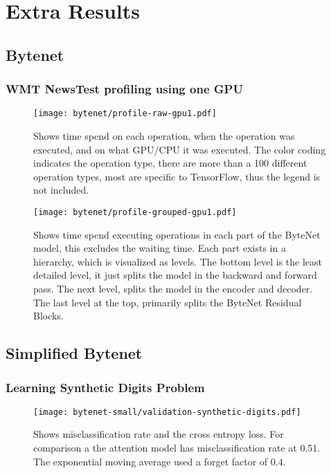 \chapter{Extra Results}

\section{Bytenet}
\label{appendix:result:bytenet-profile}

\subsection{WMT NewsTest profiling using one GPU}
\begin{figure}[h]
    \centering
    \texttt{[image: bytenet/profile-raw-gpu1.pdf]}
    \caption{Shows time spend on each operation, when the operation was executed, and on what GPU/CPU it was executed. The color coding indicates the operation type, there are more than a 100 different operation types, most are specific to TensorFlow, thus the legend is not included.}
\end{figure}

\begin{figure}[h]
    \centering
    \texttt{[image: bytenet/profile-grouped-gpu1.pdf]}
    \caption{Shows time spend executing operations in each part of the ByteNet model, this excludes the waiting time. Each part exists in a hierarchy, which is visualized as levels. The bottom level is the least detailed level, it just splits the model in the backward and forward pass. The next level, splits the model in the encoder and decoder. The last level at the top, primarily splits the ByteNet Residual Blocks.}
\end{figure}

\clearpage

\section{Simplified Bytenet}
\label{appendix:result:bytenet-small}
\subsection{Learning Synthetic Digits Problem}
\begin{figure}[h]
    \centering
    \texttt{[image: bytenet-small/validation-synthetic-digits.pdf]}
    \caption{Shows misclassification rate and the cross entropy loss. For comparison a the attention model has misclassification rate at 0.51. The exponential moving average used a forget factor of $0.4$.}
    \label{fig:result:bytenet:digits}
\end{figure}
\clearpage

